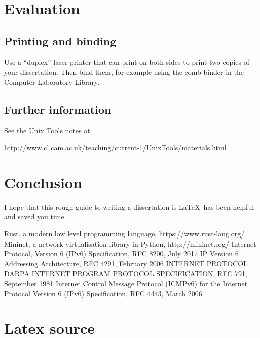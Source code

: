 \documentclass[12pt,a4paper,twoside,openright]{report}
\begin{document}
\chapter{Evaluation}

\section{Printing and binding}

Use a ``duplex'' laser printer that can print on both sides to print
two copies of your dissertation. Then bind them, for example using the
comb binder in the Computer Laboratory Library.

\section{Further information}

See the Unix Tools notes at

\url{http://www.cl.cam.ac.uk/teaching/current-1/UnixTools/materials.html}


\chapter{Conclusion}

I hope that this rough guide to writing a dissertation is \LaTeX\ has
been helpful and saved you time.


\begin{thebibliography}{1}

 Rust, a modern low level programming language, https://www.rust-lang.org/
 Mininet, a network virtualisation library in Python, http://mininet.org/
 Internet Protocol, Version 6 (IPv6) Specification, RFC 8200, July 2017
 IP Version 6 Addressing Architecture, RFC 4291, February 2006
 INTERNET PROTOCOL DARPA INTERNET PROGRAM PROTOCOL SPECIFICATION, RFC 791, September 1981
 Internet Control Message Protocol (ICMPv6) for the Internet Protocol Version 6 (IPv6) Specification, RFC 4443, March 2006

\end{thebibliography}

\appendix

\chapter{Latex source}
\end{document}
